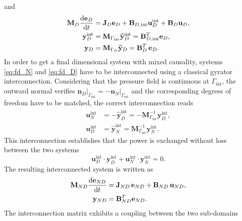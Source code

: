 \documentclass{ifacconf}
\begin{document}
and
\begin{equation}
\label{eq:fd_D}
\begin{aligned}
\mathbf{M}_D \diff{\mathbf{e}_D}{t} &= \mathbf{J}_D \mathbf{e}_D + \mathbf{B}_{D, \text{int}} \mathbf{u}_D^{\text{int}} + \mathbf{B}_D \mathbf{u}_D, \\
\mathbf{y}_D^{\text{int}} &= \mathbf{M}_{\Gamma_{\text{int}}} \widehat{\mathbf{y}}_D^{\text{int}} = \mathbf{B}_{D, \text{int}}^T \mathbf{e}_D, \\
\mathbf{y}_D &= \mathbf{M}_{\Gamma_D} \widehat{\mathbf{y}}_D = \mathbf{B}_{D}^T \, \mathbf{e}_D. \\
\end{aligned}
\end{equation}
In order to get a final dimensional system with mixed causality, systems \eqref{eq:fd_N} and \eqref{eq:fd_D} have to be interconnected using a classical gyrator interconnection. Considering that the pressure field is continuous at $\Gamma_{\text{int}}$, the outward normal verifies $\bm{n}_D \vert_{\Gamma_{\text{int}}}= - \bm{n}_N \vert_{\Gamma_{\text{int}}}$ and the corresponding degrees of freedom have to be matched, the correct interconnection reads
\begin{equation}
\begin{aligned}{}
\mathbf{u}_N^{\text{int}} &= - \widehat{\mathbf{y}}_D^{\text{int}} = - \mathbf{M}_{\Gamma_{\text{int}}}^{-1} \mathbf{y}_D^{\text{int}}, \\
\mathbf{u}_D^{\text{int}} &= \widehat{\mathbf{y}}_N^{\text{int}} = \mathbf{M}_{\Gamma_{\text{int}}}^{-1} \mathbf{y}_N^{\text{int}}.
\end{aligned}
\end{equation}
This interconnection establishes that the power is exchanged without loss between the two systems
\begin{equation}
\mathbf{u}_D^{\text{int}} \cdot \mathbf{y}_D^{\text{int}} + \mathbf{u}_N^{\text{int}} \cdot \mathbf{y}_N^{\text{int}} = 0.
\end{equation}
The resulting interconnected system is written as
\begin{equation}
\begin{aligned}
\mathbf{M}_{ND} \diff{\mathbf{e}_{ND}}{t} &= \mathbf{J}_{ND} \, \mathbf{e}_{ND} + \mathbf{B}_{ND} \, \mathbf{u}_{ND}, \\
\mathbf{y}_{ND}& = \mathbf{B}_{ND}^T \mathbf{e}_{ND}.
\end{aligned}
\end{equation}
The interconnection matrix exhibits a coupling between the two sub-domains
\end{document}
